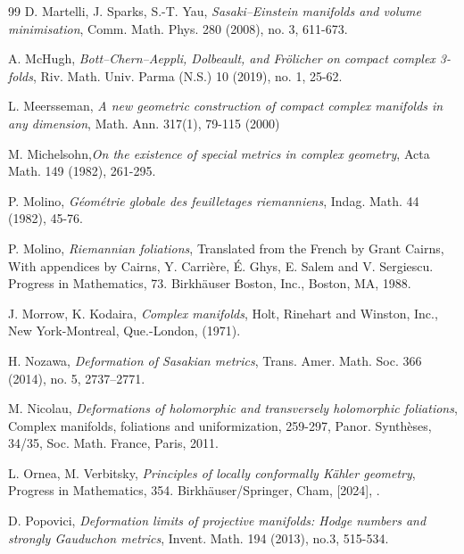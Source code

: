 \documentclass[12pt]{amsart}
\numberwithin{equation}{section}
\theoremstyle{definition}
\theoremstyle{definition}
\theoremstyle{definition}
\renewcommand{\1}{\mathsf{1}}
\renewcommand{\>}{\rightarrow}
\theoremstyle{plain} %
\theoremstyle{plain} %
\theoremstyle{plain} %
\begin{document}
\begin{thebibliography}{99}
		 D. Martelli, J. Sparks,
		S.-T. Yau,
		\textit{Sasaki--Einstein manifolds and volume minimisation},
		Comm. Math. Phys. 280 (2008), no. 3, 611-673.
		
		
		
		A. McHugh,
		\newblock \textit{Bott--Chern--Aeppli, Dolbeault, and Fr\"olicher on compact complex 3-folds},
		\newblock Riv. Math. Univ. Parma (N.S.) 10 (2019), no. 1, 25-62.
		
		L. Meersseman,
		\textit{A new geometric construction of compact complex manifolds in any dimension},
		Math. Ann. 317(1), 79-115 (2000)
		
		
		
		 M. Michelsohn,\newblock \textit{On the existence of special metrics in complex geometry}, \newblock Acta Math. 149 (1982), 261-295.
		
		
		P. Molino,
		\newblock\textit{G\'eom\'etrie globale des feuilletages riemanniens},
		\newblock Indag. Math. 44 (1982), 45-76.
		
		
		
		P. Molino,
		\newblock\textit{Riemannian foliations},
		\newblock Translated from the French by Grant Cairns,
		With appendices by Cairns, Y. Carri\`ere, \'E. Ghys, E. Salem and V. Sergiescu. Progress in Mathematics, 73.
		Birkh\"auser Boston, Inc., Boston, MA, 1988. 
		
		 J. Morrow, K. Kodaira,
		\newblock \textit{Complex manifolds},
		\newblock Holt, Rinehart and Winston, Inc.,
		New York-Montreal, Que.-London, (1971).
		
		
		 H. Nozawa,
		\textit{Deformation of Sasakian metrics}, Trans. Amer. Math. Soc. 366 (2014), no. 5, 2737–2771.
		
		
		 M. Nicolau,
		\newblock\textit{Deformations of holomorphic and transversely holomorphic foliations},
		\newblock Complex manifolds, foliations and uniformization, 259-297, Panor. Synth\`eses, 34/35, Soc. Math. France, Paris, 2011.
		
		
		
			L. Ornea, M. Verbitsky,
		\textit{Principles of locally conformally K\"ahler geometry}, Progress in Mathematics, 354. Birkh\"auser/Springer, Cham, [2024], .
		
		
		
		
		 D. Popovici, \newblock\textit{Deformation limits of projective manifolds: Hodge numbers and strongly Gauduchon metrics},
		\newblock Invent. Math. 194 (2013), no.3, 515-534.
		

\end{thebibliography}
\end{document}
